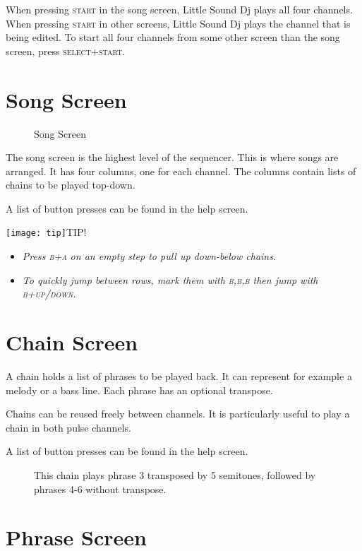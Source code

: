 When pressing \textsc{start} in the song screen, Little Sound Dj plays all four
channels. When pressing \textsc{start} in other screens, Little Sound Dj plays the
channel that is being edited.
To start all four channels from some other screen than the song screen,
press \textsc{select+start}.

\section{Song Screen}

\begin{figure}[hbtp]
\centering
{}
\caption{Song Screen}
\end{figure}

The song screen is the highest level of the sequencer. This is where songs are arranged.
It has four columns, one for each channel. The columns contain lists of chains to be played top-down.

A list of button presses can be found in the help screen.

\texttt{[image: tip]}TIP!
\begin{itemize}
	\item \textit{Press \textsc{b+a} on an empty step to pull up down-below chains.}
	\item \textit{To quickly jump between rows, mark them with \textsc{b,b,b} then jump with \textsc{b+up/down}.}
\end{itemize}

\section{Chain Screen}
A chain holds a list of phrases to be played back. It can represent for example a melody or a bass line. Each phrase has an optional transpose.

Chains can be reused freely between channels. It is particularly useful to play a chain in both pulse channels.

A list of button presses can be found in the help screen.

\begin{figure}[hbtp]
\centering
{}
	\caption{This chain plays phrase 3 transposed by 5 semitones, followed by phrases 4-6 without transpose.}
\end{figure}

\section{Phrase Screen}

